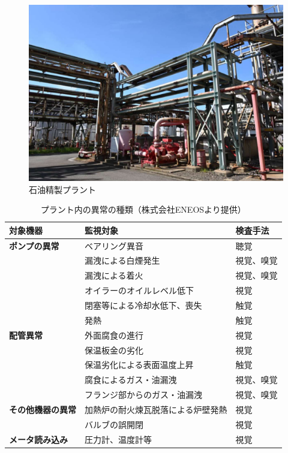 \documentclass[../main]{subfiles}
\begin{document}
\begin{figure}[t]
  \centering
  \includegraphics[keepaspectratio, width=0.8\linewidth]{chap1/view_plant.png}
  \caption{石油精製プラント}
  \label{fig:view_plant}
\end{figure}


\begin{table}[t]
  \caption{プラント内の異常の種類（株式会社ENEOSより提供）}
  \label{tab:plant_anomalies}
  \centering
  \begin{tabular}{lll}
    \toprule
    対象機器 & 監視対象 & 検査手法 \\
    \midrule
    \textbf{ポンプの異常} & ベアリング異音 & 聴覚 \\
                 & 漏洩による白煙発生 & 視覚、嗅覚 \\
                 & 漏洩による着火 & 視覚、嗅覚 \\
                 & オイラーのオイルレベル低下 & 視覚 \\
                 & 閉塞等による冷却水低下、喪失 & 触覚 \\
                 & 発熱 & 触覚 \\
    \midrule
    \textbf{配管異常} & 外面腐食の進行 & 視覚 \\
               & 保温板金の劣化 & 視覚 \\
               & 保温劣化による表面温度上昇 & 触覚 \\
               & 腐食によるガス・油漏洩 & 視覚、嗅覚 \\
               & フランジ部からのガス・油漏洩 & 視覚、嗅覚 \\
    \midrule
    \textbf{その他機器の異常} & 加熱炉の耐火煉瓦脱落による炉壁発熱 & 視覚 \\
                   & バルブの誤開閉 & 視覚 \\
    \midrule
    \textbf{メータ読み込み} & 圧力計、温度計等 & 視覚 \\
    \bottomrule
  \end{tabular}
\end{table}
\end{document}
